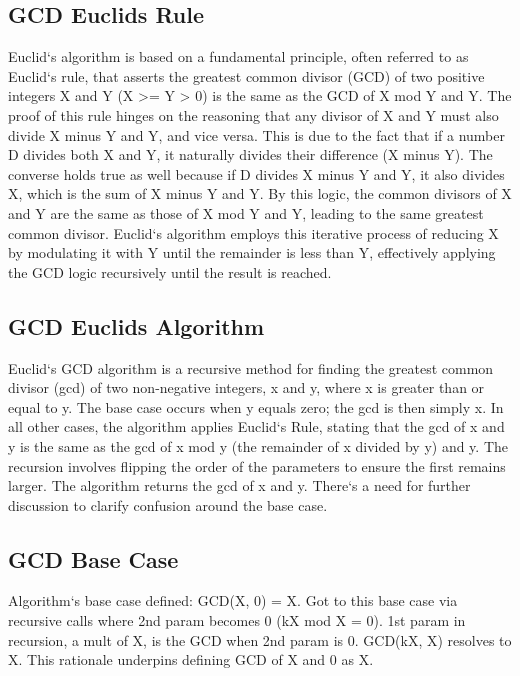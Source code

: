 \subsection*{GCD  Euclids Rule}
Euclid`s algorithm is based on a fundamental principle, often referred to as Euclid`s rule, that asserts the greatest common divisor (GCD) of two positive integers X and Y (X \textgreater{}= Y \textgreater{} 0) is the same as the GCD of X mod Y and Y\@.
The proof of this rule hinges on the reasoning that any divisor of X and Y must also divide X minus Y and Y, and vice versa.
This is due to the fact that if a number D divides both X and Y, it naturally divides their difference (X minus Y).
The converse holds true as well because if D divides X minus Y and Y, it also divides X, which is the sum of X minus Y and Y\@.
By this logic, the common divisors of X and Y are the same as those of X mod Y and Y, leading to the same greatest common divisor.
Euclid`s algorithm employs this iterative process of reducing X by modulating it with Y until the remainder is less than Y, effectively applying the GCD logic recursively until the result is reached.

\subsection*{GCD  Euclids Algorithm}
Euclid`s GCD algorithm is a recursive method for finding the greatest common divisor (gcd) of two non-negative integers, x and y, where x is greater than or equal to y.
The base case occurs when y equals zero; the gcd is then simply x.
In all other cases, the algorithm applies Euclid`s Rule, stating that the gcd of x and y is the same as the gcd of x mod y (the remainder of x divided by y) and y.
The recursion involves flipping the order of the parameters to ensure the first remains larger.
The algorithm returns the gcd of x and y.
There`s a need for further discussion to clarify confusion around the base case.

\subsection*{GCD  Base Case}
Algorithm`s base case defined: GCD(X, 0) = X\@.
Got to this base case via recursive calls where 2nd param becomes 0 (kX mod X = 0).
1st param in recursion, a mult of X, is the GCD when 2nd param is 0.
GCD(kX, X) resolves to X\@.
This rationale underpins defining GCD of X and 0 as X\@.

